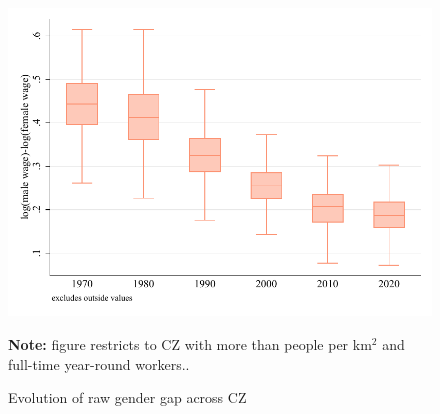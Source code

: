 \begin{figure}[!h]
\centering
\caption{Evolution of raw gender gap across CZ}
\includegraphics[width=.6\textwidth]{../2_analysis/output/figures/cz_gap_dispersion_full_time}
\par \begin{minipage}[h]{\textwidth}{\scriptsize\textbf{Note:} figure restricts to CZ with more than people per km$^2$ and full-time year-round workers..}\end{minipage}
\end{figure}
